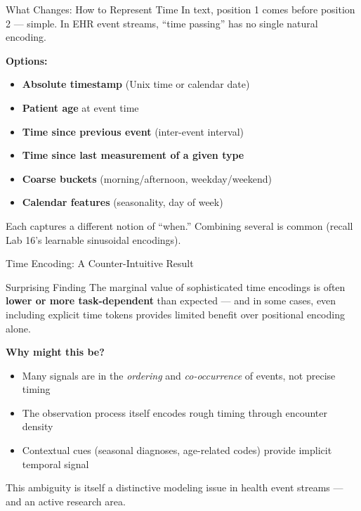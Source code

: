 \documentclass[aspectratio=169,10pt]{beamer}
\begin{document}
\begin{frame}{What Changes: How to Represent Time}
In text, position 1 comes before position 2 --- simple. In EHR event streams, ``time passing'' has no single natural encoding.
\vspace{0.3em}

\textbf{Options:}
\begin{itemize}[<+->]
    \item \textbf{Absolute timestamp} (Unix time or calendar date)
    \item \textbf{Patient age} at event time
    \item \textbf{Time since previous event} (inter-event interval)
    \item \textbf{Time since last measurement of a given type}
    \item \textbf{Coarse buckets} (morning/afternoon, weekday/weekend)
    \item \textbf{Calendar features} (seasonality, day of week)
\end{itemize}
\pause
\vspace{0.2em}
Each captures a different notion of ``when.'' Combining several is common (recall Lab 16's learnable sinusoidal encodings).
\end{frame}

\begin{frame}{Time Encoding: A Counter-Intuitive Result}
\begin{alertblock}{Surprising Finding}
The marginal value of sophisticated time encodings is often \textbf{lower or more task-dependent} than expected --- and in some cases, even including explicit time tokens provides limited benefit over positional encoding alone.
\end{alertblock}
\vspace{0.2em}
\textbf{Why might this be?}
\begin{itemize}[<+->]
    \item Many signals are in the \emph{ordering} and \emph{co-occurrence} of events, not precise timing
    \item The observation process itself encodes rough timing through encounter density
    \item Contextual cues (seasonal diagnoses, age-related codes) provide implicit temporal signal
\end{itemize}
\vspace{0.2em}
This ambiguity is itself a distinctive modeling issue in health event streams --- and an active research area.
\end{frame}
\end{document}
